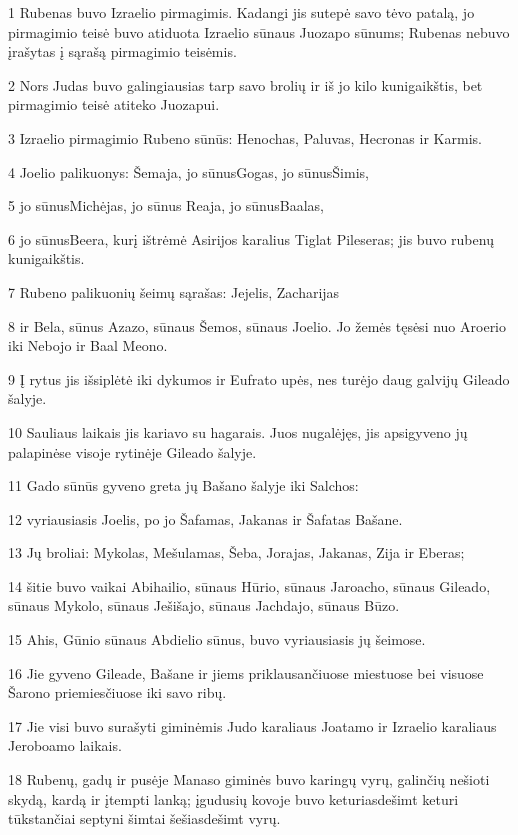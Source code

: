 \par 1 Rubenas buvo Izraelio pirmagimis. Kadangi jis sutepė savo tėvo patalą, jo pirmagimio teisė buvo atiduota Izraelio sūnaus Juozapo sūnums; Rubenas nebuvo įrašytas į sąrašą pirmagimio teisėmis. 
\par 2 Nors Judas buvo galingiausias tarp savo brolių ir iš jo kilo kunigaikštis, bet pirmagimio teisė atiteko Juozapui. 
\par 3 Izraelio pirmagimio Rubeno sūnūs: Henochas, Paluvas, Hecronas ir Karmis. 
\par 4 Joelio palikuonys: Šemaja, jo sūnus­Gogas, jo sūnus­Šimis, 
\par 5 jo sūnus­Michėjas, jo sūnus­ Reaja, jo sūnus­Baalas, 
\par 6 jo sūnus­Beera, kurį ištrėmė Asirijos karalius Tiglat Pileseras; jis buvo rubenų kunigaikštis. 
\par 7 Rubeno palikuonių šeimų sąrašas: Jejelis, Zacharijas 
\par 8 ir Bela, sūnus Azazo, sūnaus Šemos, sūnaus Joelio. Jo žemės tęsėsi nuo Aroerio iki Nebojo ir Baal Meono. 
\par 9 Į rytus jis išsiplėtė iki dykumos ir Eufrato upės, nes turėjo daug galvijų Gileado šalyje. 
\par 10 Sauliaus laikais jis kariavo su hagarais. Juos nugalėjęs, jis apsigyveno jų palapinėse visoje rytinėje Gileado šalyje. 
\par 11 Gado sūnūs gyveno greta jų Bašano šalyje iki Salchos: 
\par 12 vyriausiasis Joelis, po jo Šafamas, Jakanas ir Šafatas Bašane. 
\par 13 Jų broliai: Mykolas, Mešulamas, Šeba, Jorajas, Jakanas, Zija ir Eberas; 
\par 14 šitie buvo vaikai Abihailio, sūnaus Hūrio, sūnaus Jaroacho, sūnaus Gileado, sūnaus Mykolo, sūnaus Ješišajo, sūnaus Jachdajo, sūnaus Būzo. 
\par 15 Ahis, Gūnio sūnaus Abdielio sūnus, buvo vyriausiasis jų šeimose. 
\par 16 Jie gyveno Gileade, Bašane ir jiems priklausančiuose miestuose bei visuose Šarono priemiesčiuose iki savo ribų. 
\par 17 Jie visi buvo surašyti giminėmis Judo karaliaus Joatamo ir Izraelio karaliaus Jeroboamo laikais. 
\par 18 Rubenų, gadų ir pusėje Manaso giminės buvo karingų vyrų, galinčių nešioti skydą, kardą ir įtempti lanką; įgudusių kovoje buvo keturiasdešimt keturi tūkstančiai septyni šimtai šešiasdešimt vyrų. 
